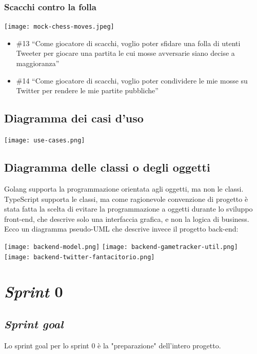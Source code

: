 \documentclass{article}
\begin{document}
\subsubsection{Scacchi contro la folla}

\texttt{[image: mock-chess-moves.jpeg]}

\begin{itemize}
	\item \#13 ``Come giocatore di scacchi, voglio poter sfidare una folla di
	      utenti Tweeter per giocare una partita le cui mosse avversarie siano
	      decise a maggioranza''
	\item \#14 ``Come giocatore di scacchi, voglio poter condividere le mie mosse
	      su Twitter per rendere le mie partite pubbliche''
\end{itemize}

\subsection{Diagramma dei casi d'uso}

\texttt{[image: use-cases.png]}

\subsection{Diagramma delle classi o degli oggetti}

Golang supporta la programmazione orientata agli oggetti, ma non le classi.
TypeScript supporta le classi, ma come ragionevole convenzione di progetto è
stata fatta la scelta di evitare la programmazione a oggetti durante lo
sviluppo front-end, che descrive solo una interfaccia grafica, e non la logica
di business. Ecco un diagramma pseudo-UML che descrive invece il progetto
back-end:

\texttt{[image: backend-model.png]}
\texttt{[image: backend-gametracker-util.png]}
\texttt{[image: backend-twitter-fantacitorio.png]}

\section{\emph{Sprint} 0}

\subsection{\emph{Sprint goal}}

Lo sprint goal per lo sprint 0 è la "preparazione" dell'intero progetto.
\end{document}
